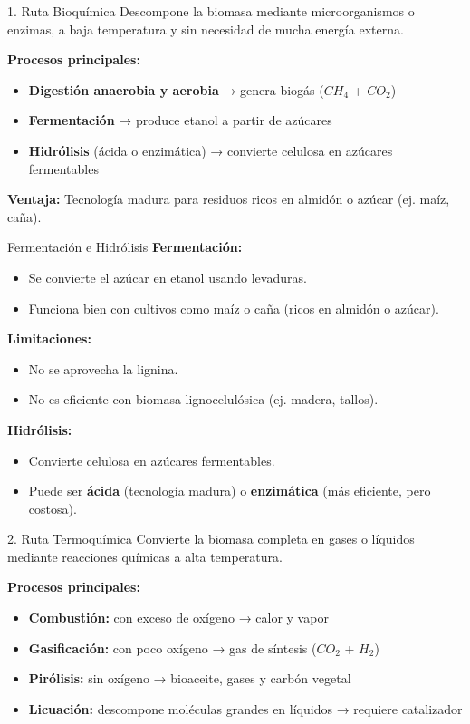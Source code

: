 \documentclass[../../main.tex]{subfiles}
\begin{document}
\begin{frame}{1. Ruta Bioquímica}
\justifying
Descompone la biomasa mediante microorganismos o enzimas, a baja temperatura y sin necesidad de mucha energía externa.

\vspace{0.5em}
\textbf{Procesos principales:}
\begin{itemize}
  \item \textbf{Digestión anaerobia y aerobia} → genera biogás (\(CH_4\) + \(CO_2\))
  \item \textbf{Fermentación} → produce etanol a partir de azúcares
  \item \textbf{Hidrólisis} (ácida o enzimática) → convierte celulosa en azúcares fermentables
\end{itemize}

\vspace{0.5em}
\textbf{Ventaja:} Tecnología madura para residuos ricos en almidón o azúcar (ej. maíz, caña).
\end{frame}
\begin{frame}{Fermentación e Hidrólisis}
\justifying
\textbf{Fermentación:}
\begin{itemize}
  \item Se convierte el azúcar en etanol usando levaduras.
  \item Funciona bien con cultivos como maíz o caña (ricos en almidón o azúcar).
\end{itemize}

\textbf{Limitaciones:}
\begin{itemize}
  \item No se aprovecha la lignina.
  \item No es eficiente con biomasa lignocelulósica (ej. madera, tallos).
\end{itemize}

\textbf{Hidrólisis:}
\begin{itemize}
  \item Convierte celulosa en azúcares fermentables.
  \item Puede ser \textbf{ácida} (tecnología madura) o \textbf{enzimática} (más eficiente, pero costosa).
\end{itemize}
\end{frame}
\begin{frame}{2. Ruta Termoquímica}
\justifying
Convierte la biomasa completa en gases o líquidos mediante reacciones químicas a alta temperatura.

\vspace{0.5em}
\textbf{Procesos principales:}
\begin{itemize}
  \item \textbf{Combustión:} con exceso de oxígeno → calor y vapor
  \item \textbf{Gasificación:} con poco oxígeno → gas de síntesis (\(CO_2\) + \(H_2\))
  \item \textbf{Pirólisis:} sin oxígeno → bioaceite, gases y carbón vegetal
  \item \textbf{Licuación:} descompone moléculas grandes en líquidos → requiere catalizador
\end{itemize}
\end{frame}
\end{document}
